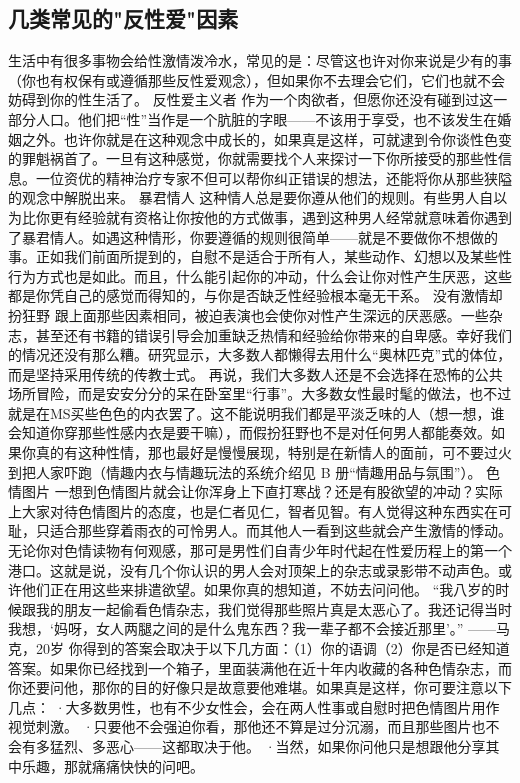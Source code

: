 \documentclass[12pt,UTF8,openany]{ctexbook}
\begin{document}
\subsection*{几类常见的"反性爱"因素}
生活中有很多事物会给性激情泼冷水，常见的是：尽管这也许对你来说是少有的事（你也有权保有或遵循那些反性爱观念），但如果你不去理会它们，它们也就不会妨碍到你的性生活了。
反性爱主义者
作为一个肉欲者，但愿你还没有碰到过这一部分人口。他们把“性”当作是一个肮脏的字眼——不该用于享受，也不该发生在婚姻之外。也许你就是在这种观念中成长的，如果真是这样，可就逮到令你谈性色变的罪魁祸首了。一旦有这种感觉，你就需要找个人来探讨一下你所接受的那些性信息。一位资优的精神治疗专家不但可以帮你纠正错误的想法，还能将你从那些狭隘的观念中解脱出来。
暴君情人
这种情人总是要你遵从他们的规则。有些男人自以为比你更有经验就有资格让你按他的方式做事，遇到这种男人经常就意味着你遇到了暴君情人。如遇这种情形，你要遵循的规则很简单——就是不要做你不想做的事。正如我们前面所提到的，自慰不是适合于所有人，某些动作、幻想以及某些性行为方式也是如此。而且，什么能引起你的冲动，什么会让你对性产生厌恶，这些都是你凭自己的感觉而得知的，与你是否缺乏性经验根本毫无干系。
没有激情却扮狂野
跟上面那些因素相同，被迫表演也会使你对性产生深远的厌恶感。一些杂志，甚至还有书籍的错误引导会加重缺乏热情和经验给你带来的自卑感。幸好我们的情况还没有那么糟。研究显示，大多数人都懒得去用什么“奥林匹克”式的体位，而是坚持采用传统的传教士式。
再说，我们大多数人还是不会选择在恐怖的公共场所冒险，而是安安分分的呆在卧室里“行事”。大多数女性最时髦的做法，也不过就是在MS买些色色的内衣罢了。这不能说明我们都是平淡乏味的人（想一想，谁会知道你穿那些性感内衣是要干嘛），而假扮狂野也不是对任何男人都能奏效。如果你真的有这种性情，那也最好是慢慢展现，特别是在新情人的面前，可不要过火到把人家吓跑（情趣内衣与情趣玩法的系统介绍见 B 册“情趣用品与氛围”）。
色情图片
一想到色情图片就会让你浑身上下直打寒战？还是有股欲望的冲动？实际上大家对待色情图片的态度，也是仁者见仁，智者见智。有人觉得这种东西实在可耻，只适合那些穿着雨衣的可怜男人。而其他人一看到这些就会产生激情的悸动。无论你对色情读物有何观感，那可是男性们自青少年时代起在性爱历程上的第一个港口。这就是说，没有几个你认识的男人会对顶架上的杂志或录影带不动声色。或许他们正在用这些来排遣欲望。如果你真的想知道，不妨去问问他。
“我八岁的时候跟我的朋友一起偷看色情杂志，我们觉得那些照片真是太恶心了。我还记得当时我想，‘妈呀，女人两腿之间的是什么鬼东西？我一辈子都不会接近那里’。”
——马克，20岁
你得到的答案会取决于以下几方面：（1）你的语调（2）你是否已经知道答案。如果你已经找到一个箱子，里面装满他在近十年内收藏的各种色情杂志，而你还要问他，那你的目的好像只是故意要他难堪。如果真是这样，你可要注意以下几点：
·大多数男性，也有不少女性会，会在两人性事或自慰时把色情图片用作视觉刺激。
·只要他不会强迫你看，那他还不算是过分沉溺，而且那些图片也不会有多猛烈、多恶心——这都取决于他。
·当然，如果你问他只是想跟他分享其中乐趣，那就痛痛快快的问吧。
\end{document}
